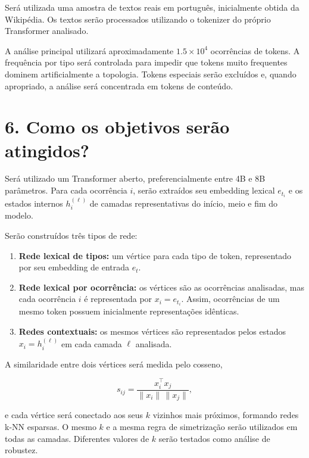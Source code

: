 \documentclass[11pt,a4paper]{article}
\begin{document}
Será utilizada uma amostra de textos reais em português, inicialmente obtida da 
Wikipédia. Os textos serão processados utilizando o tokenizer do
próprio Transformer analisado.

A análise principal utilizará aproximadamente $1.5\times10^4$ ocorrências de
tokens. A frequência por tipo será controlada para impedir que tokens muito
frequentes dominem artificialmente a topologia. Tokens especiais serão
excluídos e, quando apropriado, a análise será concentrada em tokens de
conteúdo.

\section*{6. Como os objetivos serão atingidos?}

Será utilizado um Transformer aberto, preferencialmente entre
4B e 8B parâmetros. Para cada ocorrência $i$, serão extraídos seu
embedding lexical $e_{t_i}$ e os estados internos $h_i^{(\ell)}$ de camadas
representativas do início, meio e fim do modelo.

Serão construídos três tipos de rede:

\begin{enumerate}

    \item \textbf{Rede lexical de tipos:} um vértice para cada tipo de token,
    representado por seu embedding de entrada $e_t$.

    \item \textbf{Rede lexical por ocorrência:} os vértices são as ocorrências
    analisadas, mas cada ocorrência $i$ é representada por
    $x_i=e_{t_i}$. Assim, ocorrências de um mesmo token possuem inicialmente
    representações idênticas.

    \item \textbf{Redes contextuais:} os mesmos vértices são representados
    pelos estados $x_i=h_i^{(\ell)}$ em cada camada $\ell$ analisada.

\end{enumerate}

A similaridade entre dois vértices será medida pelo cosseno,

\[
s_{ij} =
\frac{x_i^\top x_j}
{\lVert x_i\rVert\,\lVert x_j\rVert},
\]

e cada vértice será conectado aos seus $k$ vizinhos mais próximos, formando
redes k-NN esparsas. O mesmo $k$ e a mesma regra de simetrização serão
utilizados em todas as camadas. Diferentes valores de $k$ serão testados como
análise de robustez.
\end{document}
